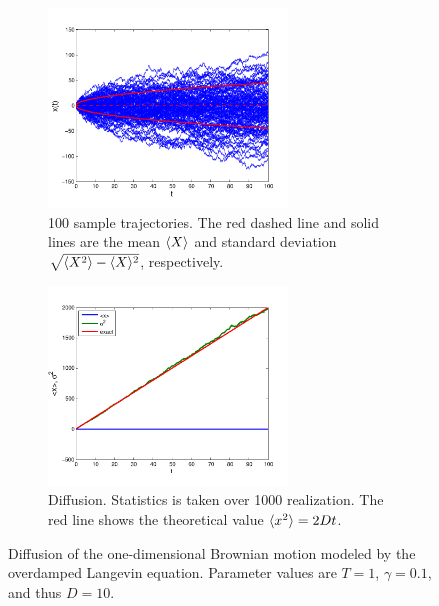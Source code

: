 \begin{figure}
	\centering
	\begin{subfigure}{0.45\textwidth}
		\centering
		\includegraphics[width=2.5in]{18.Langevin/1d_overdamped_traject.pdf}
		\caption{100 sample trajectories.  The red dashed line and solid lines are the mean $\langle X \rangle$ and standard deviation
$\sqrt{\langle X^2 \rangle-\langle X \rangle^2}$, respectively.}
	\label{fig:1d_od_traj}
	\end{subfigure}
	\begin{subfigure}{0.45\textwidth}
		\centering
		\includegraphics[width=2.5in]{18.Langevin/1d_overdamped_diffusion.pdf}
		\caption{Diffusion. Statistics is taken over 1000 realization. The red line shows the theoretical value $\langle x^2 \rangle = 2 D t$.}
		\label{fig:1d_od_diff}
	\end{subfigure}
\caption{Diffusion of the one-dimensional Brownian motion modeled by the overdamped Langevin equation. Parameter values are $T=1$, $\gamma=0.1$, and thus $D=10$.}
\end{figure}

